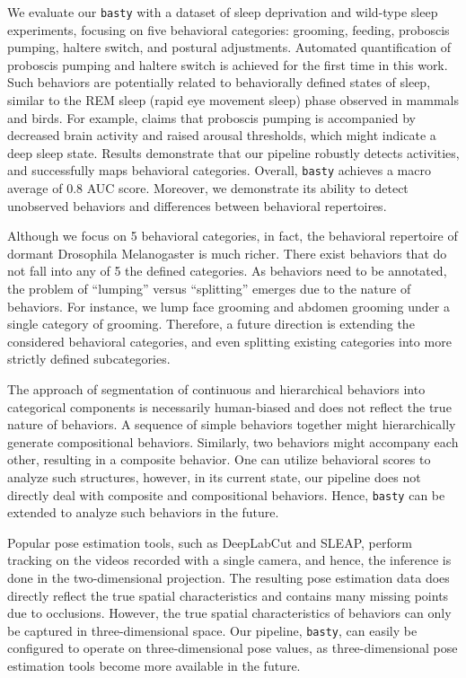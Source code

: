 We evaluate our \texttt{basty} with a dataset of sleep deprivation and wild-type sleep experiments, focusing on five behavioral categories: grooming, feeding, proboscis pumping, haltere switch, and postural adjustments.
Automated quantification of proboscis pumping and haltere switch is achieved for the first time in this work.
Such behaviors are potentially related to behaviorally defined states of sleep, similar to the REM sleep (rapid eye movement sleep) phase observed in mammals and birds.
For example, \citet{van_alphen_deep_2021} claims that proboscis pumping is accompanied by decreased brain activity and raised arousal thresholds, which might indicate a deep sleep state.
Results demonstrate that our pipeline robustly detects activities, and successfully maps behavioral categories.
Overall, \texttt{basty} achieves a macro average of 0.8 AUC score.
Moreover, we demonstrate its ability to detect unobserved behaviors and differences between behavioral repertoires.

Although we focus on 5 behavioral categories, in fact, the behavioral repertoire of dormant Drosophila Melanogaster is much richer. There exist behaviors that do not fall into any of 5 the defined categories.
As behaviors need to be annotated, the problem of ``lumping'' versus ``splitting'' emerges due to the nature of behaviors. For instance, we lump face grooming and abdomen grooming under a single category of grooming.
Therefore, a future direction is extending the considered behavioral categories, and even splitting existing categories into more strictly defined subcategories.

The approach of segmentation of continuous and hierarchical behaviors into categorical components is necessarily human-biased and does not reflect the true nature of behaviors.
A sequence of simple behaviors together might hierarchically generate compositional behaviors.
Similarly, two behaviors might accompany each other, resulting in a composite behavior.
One can utilize behavioral scores to analyze such structures, however, in its current state, our pipeline does not directly deal with composite and compositional behaviors.
Hence, \texttt{basty} can be extended to analyze such behaviors in the future.

Popular pose estimation tools, such as DeepLabCut and SLEAP, perform tracking on the videos recorded with a single camera, and hence, the inference is done in the two-dimensional projection.
The resulting pose estimation data does directly reflect the true spatial characteristics and contains  many missing points due to occlusions.
However, the true spatial characteristics of behaviors can only be captured in three-dimensional space.
Our pipeline, \texttt{basty}, can easily be configured to operate on three-dimensional pose values, as three-dimensional pose estimation tools become more available in the future.

